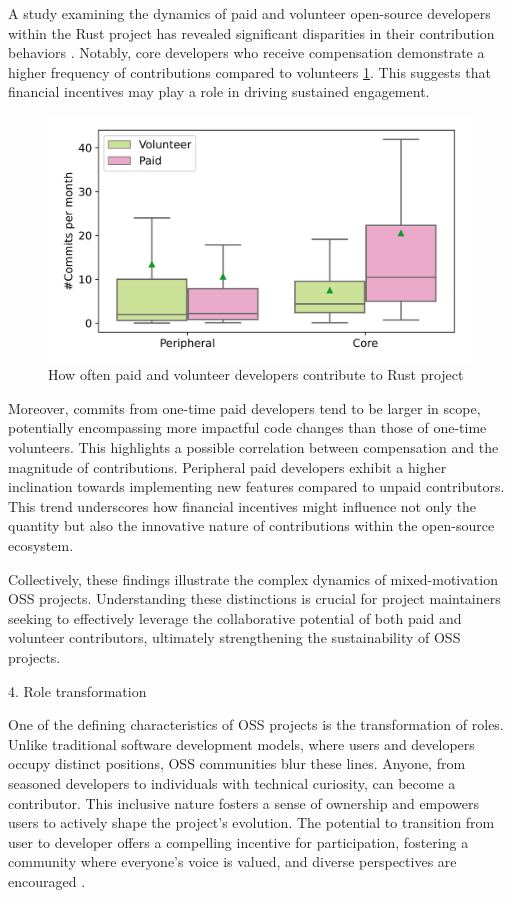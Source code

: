 A study examining the dynamics of paid and volunteer open-source developers within the Rust project has revealed significant disparities in their contribution behaviors \cite{08zhang2024paid}. Notably, core developers who receive compensation demonstrate a higher frequency of contributions compared to volunteers \ref{fig:contribution_frequency}. This suggests that financial incentives may play a role in driving sustained engagement.

\begin{figure}[ht]
    \centering
    \includegraphics[width=0.65\linewidth]{figs/Contribution_frequency.png}
    \caption{How often paid and volunteer developers contribute to Rust project \cite{08zhang2024paid}}
    \label{fig:contribution_frequency}
\end{figure}


Moreover, commits from one-time paid developers tend to be larger in scope, potentially encompassing more impactful code changes than those of one-time volunteers. This highlights a possible correlation between compensation and the magnitude of contributions. Peripheral paid developers exhibit a higher inclination towards implementing new features compared to unpaid contributors. This trend underscores how financial incentives might influence not only the quantity but also the innovative nature of contributions within the open-source ecosystem.

Collectively, these findings illustrate the complex dynamics of mixed-motivation OSS projects. Understanding these distinctions is crucial for project maintainers seeking to effectively leverage the collaborative potential of both paid and volunteer contributors, ultimately strengthening the sustainability of OSS projects.

4. Role transformation

One of the defining characteristics of OSS projects is the transformation of roles.  Unlike traditional software development models, where users and developers occupy distinct positions, OSS communities blur these lines.  Anyone, from seasoned developers to individuals with technical curiosity, can become a contributor.  This inclusive nature fosters a sense of ownership and empowers users to actively shape the project's evolution.  The potential to transition from user to developer offers a compelling incentive for participation, fostering a community where everyone's voice is valued, and diverse perspectives are encouraged \cite{06ye2003toward,09lakhani2005hackers}.

